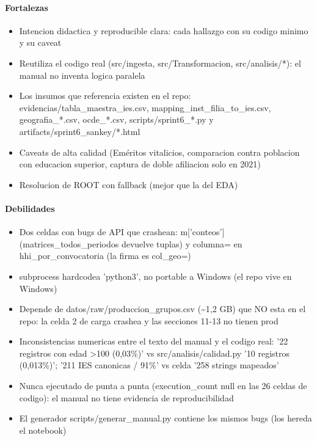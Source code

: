 \paragraph{Fortalezas}
\begin{itemize}
  \item Intencion didactica y reproducible clara: cada hallazgo con su codigo minimo y su caveat
  \item Reutiliza el codigo real (src/ingesta, src/Transformacion, src/analisis/*): el manual no inventa logica paralela
  \item Los insumos que referencia existen en el repo: evidencias/tabla\_maestra\_ies.csv, mapping\_inst\_filia\_to\_ies.csv, geografia\_*.csv, ocde\_*.csv, scripts/sprint6\_*.py y artifacts/sprint6\_sankey/*.html
  \item Caveats de alta calidad (Eméritos vitalicios, comparacion contra poblacion con educacion superior, captura de doble afiliacion solo en 2021)
  \item Resolucion de ROOT con fallback (mejor que la del EDA)
\end{itemize}

\paragraph{Debilidades}
\begin{itemize}
  \item Dos celdas con bugs de API que crashean: m['conteos'] (matrices\_todos\_periodos devuelve tuplas) y columna= en hhi\_por\_convocatoria (la firma es col\_geo=)
  \item subprocess hardcodea 'python3', no portable a Windows (el repo vive en Windows)
  \item Depende de datos/raw/produccion\_grupos.csv (\textasciitilde{}1,2 GB) que NO esta en el repo: la celda 2 de carga crashea y las secciones 11-13 no tienen prod
  \item Inconsistencias numericas entre el texto del manual y el codigo real: '22 registros con edad >100 (0,03\%)' vs src/analisis/calidad.py '10 registros (0,013\%)'; '211 IES canonicas / 91\%' vs celda '258 strings mapeados'
  \item Nunca ejecutado de punta a punta (execution\_count null en las 26 celdas de codigo): el manual no tiene evidencia de reproducibilidad
  \item El generador scripts/generar\_manual.py contiene los mismos bugs (los hereda el notebook)
\end{itemize}


